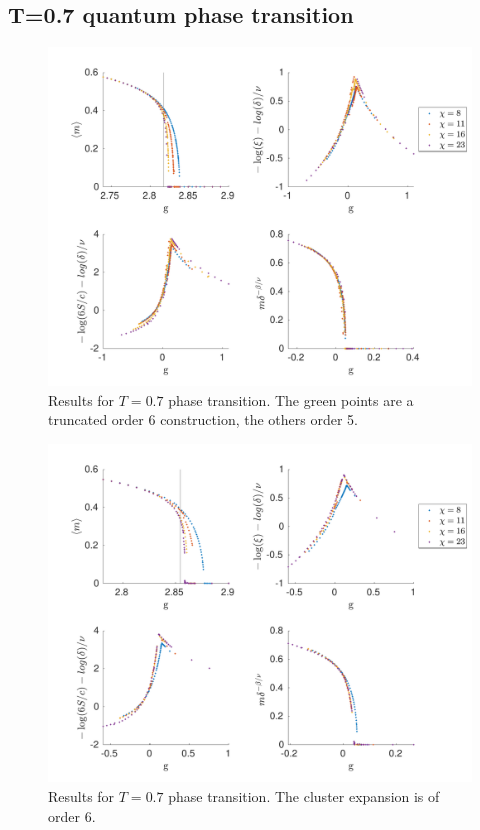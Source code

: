 \subsection{T=0.7 quantum phase transition}\label{tphasetranssubsec}

\begin{figure}[!htbp]
  \center
  \includegraphics[width=\textwidth]{Figuren/phasediag/t07/full.pdf}
  \caption{Results for $T=0.7$ phase transition. The green points are a truncated order 6 construction, the others order 5.  }
  \label{fig:phase:t07:full}
\end{figure}

\begin{figure}[!htbp]
  \center
  \includegraphics[width=\textwidth]{Figuren/phasediag/t07/zoomed2.pdf}
  \caption{Results for $T=0.7$ phase transition. The cluster expansion is of order 6.}
  \label{fig:phase:t07:full2}
\end{figure}

